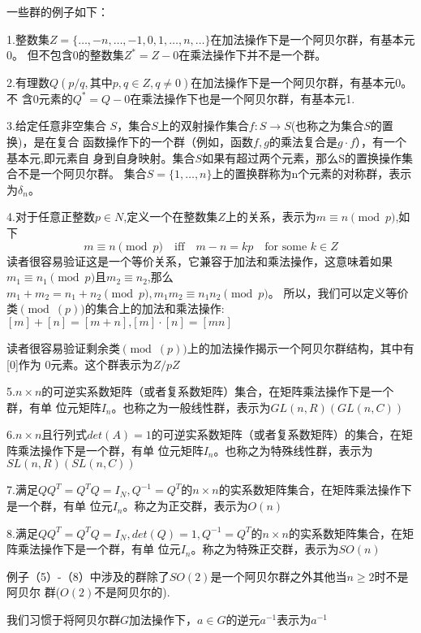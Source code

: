 一些群的例子如下：
\begin{example}
  
  1.整数集$Z = \{\ldots,-n,\ldots,-1,0,1,\ldots,n,\ldots\}$在加法操作下是一个阿贝尔群，有基本元0。
  但不包含0的整数集$Z^*=Z-{0}$在乘法操作下并不是一个群。

  2.有理数$Q(p/q,其中p,q \in Z, q\neq 0)$在加法操作下是一个阿贝尔群，有基本元0。不
  含0元素的$Q^* = Q-{0}$在乘法操作下也是一个阿贝尔群，有基本元1.

  3.给定任意非空集合 $S$，集合$S$上的双射操作集合$f:S\to S$(也称之为集合$S$的置换)，是在复合
  函数操作下的一个群（例如，函数$f,g$的乘法复合是$g\cdot f$），有一个基本元,即元素自
  身到自身映射。集合$S$如果有超过两个元素，那么S的置换操作集合不是一个阿贝尔群。
  集合$S=\{1,\ldots ,n\}$上的置换群称为n个元素的对称群，表示为$\delta_n$。

  4.对于任意正整数$p \in N$,定义一个在整数集$Z$上的关系，表示为$m \equiv n \pmod{p}$,如
  下
  \[
    m \equiv n\pmod{p} \quad\textrm{iff}\quad m-n=kp\quad \textrm{for some } k \in Z
  \]
  读者很容易验证这是一个等价关系，它兼容于加法和乘法操作，这意味着如果$m_1 \equiv n_1
  \pmod{p}$且$m_2 \equiv n_2$,那么$m_1+m_2=n_1+n_2 \pmod{p}, m_1m_2 \equiv n_1n_2 \pmod{p}$。
  所以，我们可以定义等价类$\pmod(p)$的集合上的加法和乘法操作:$[m] + [n] = [m+n]\textrm{,}
  [m]\cdot[n]= [mn]$

  读者很容易验证剩余类$\pmod(p)$上的加法操作揭示一个阿贝尔群结构，其中有[0]作为
  0元素。这个群表示为$Z/pZ$

  5.$n\times n$的可逆实系数矩阵（或者复系数矩阵）集合，在矩阵乘法操作下是一个群，有单
  位元矩阵$I_n$。也称之为一般线性群，表示为$GL(n,R)(GL(n,C))$
  
  6.$n\times n$且行列式$det(A)=1$的可逆实系数矩阵（或者复系数矩阵）的集合，在矩阵乘法操作下是一个群，有单
  位元矩阵$I_n$。也称之为特殊线性群，表示为$SL(n,R)(SL(n,C))$

  7.满足$QQ^T=Q^TQ=I_N,Q^{-1}=Q^T$的$n\times n$的实系数矩阵集合，在矩阵乘法操作下是一个群，有单
  位元$I_n$。称之为正交群，表示为$O(n)$

  8.满足$QQ^T=Q^TQ=I_N,det(Q)=1,Q^{-1}=Q^T$的$n\times n$的实系数矩阵集合，在矩阵乘法操作下是一个群，有单
  位元$I_n$。称之为特殊正交群，表示为$SO(n)$

\end{example}

例子（5）-（8）中涉及的群除了$SO(2)$是一个阿贝尔群之外其他当$n\ge 2$时不是阿贝尔
群($O(2)$不是阿贝尔的).

我们习惯于将阿贝尔群$G$加法操作下，$a\in G$的逆元$a^{-1}$表示为$a^{-1}$

